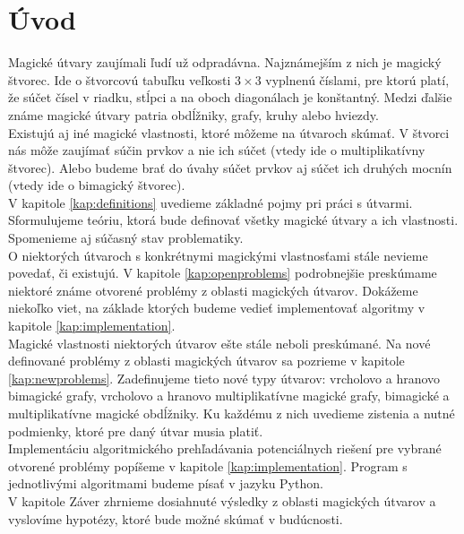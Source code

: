 \chapter*{Úvod} %

Magické útvary zaujímali ľudí už odpradávna. Najznámejším z nich je magický štvorec. Ide o štvorcovú tabuľku veľkosti $3 \times 3$ vyplnenú číslami, pre ktorú platí, že súčet čísel v riadku, stĺpci a na oboch diagonálach je konštantný. Medzi ďalšie známe magické útvary patria obdĺžniky, grafy, kruhy alebo hviezdy. \\

Existujú aj iné magické vlastnosti, ktoré môžeme na útvaroch skúmať. V štvorci nás môže zaujímať súčin prvkov a nie ich súčet (vtedy ide o multiplikatívny štvorec). Alebo budeme brať do úvahy súčet prvkov aj súčet ich druhých mocnín (vtedy ide o bimagický štvorec). \\

V kapitole \ref{kap:definitions} uvedieme základné pojmy pri práci s útvarmi. Sformulujeme teóriu, ktorá bude definovať všetky magické útvary a ich vlastnosti. Spomenieme aj súčasný stav problematiky. \\

O niektorých útvaroch s konkrétnymi magickými vlastnosťami stále nevieme povedať, či existujú. V kapitole \ref{kap:openproblems} podrobnejšie preskúmame niektoré známe otvorené problémy z oblasti magických útvarov. Dokážeme niekoľko viet, na základe ktorých budeme vedieť implementovať algoritmy v kapitole \ref{kap:implementation}. \\

Magické vlastnosti niektorých útvarov ešte stále neboli preskúmané. Na nové definované problémy z oblasti magických útvarov sa pozrieme v kapitole \ref{kap:newproblems}. Zadefinujeme tieto nové typy útvarov: vrcholovo a hranovo bimagické grafy, vrcholovo a hranovo multiplikatívne magické grafy, bimagické a multiplikatívne magické obdĺžniky. Ku každému z nich uvedieme zistenia a nutné podmienky, ktoré pre daný útvar musia platiť. \\

Implementáciu algoritmického prehľadávania potenciálnych riešení pre vybrané otvorené problémy popíšeme v kapitole \ref{kap:implementation}. Program s jednotlivými algoritmami budeme písať v jazyku Python. \\

V kapitole Záver zhrnieme dosiahnuté výsledky z oblasti magických útvarov a vyslovíme hypotézy, ktoré bude možné skúmať v budúcnosti.
